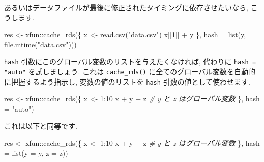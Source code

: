 \documentclass[
  11pt,
  lualatex,
  ja=standard]{bxjsreport}
\newenvironment{Shaded}{\begin{snugshade}}{\end{snugshade}}
\newcommand{\AttributeTok}[1]{\textcolor[rgb]{0.77,0.63,0.00}{#1}}
\newcommand{\CommentTok}[1]{\textcolor[rgb]{0.56,0.35,0.01}{\textit{#1}}}
\newcommand{\DecValTok}[1]{\textcolor[rgb]{0.00,0.00,0.81}{#1}}
\newcommand{\FunctionTok}[1]{\textcolor[rgb]{0.00,0.00,0.00}{#1}}
\newcommand{\NormalTok}[1]{#1}
\newcommand{\OtherTok}[1]{\textcolor[rgb]{0.56,0.35,0.01}{#1}}
\newcommand{\SpecialCharTok}[1]{\textcolor[rgb]{0.00,0.00,0.00}{#1}}
\newcommand{\StringTok}[1]{\textcolor[rgb]{0.31,0.60,0.02}{#1}}
\begin{document}
あるいはデータファイルが最後に修正されたタイミングに依存させたいなら, こうします.

\begin{Shaded}
\begin{Highlighting}[]
\NormalTok{res }\OtherTok{\textless{}{-}}\NormalTok{ xfun}\SpecialCharTok{::}\FunctionTok{cache\_rds}\NormalTok{(\{}
\NormalTok{  x }\OtherTok{\textless{}{-}} \FunctionTok{read.csv}\NormalTok{(}\StringTok{"data.csv"}\NormalTok{)}
\NormalTok{  x[[}\DecValTok{1}\NormalTok{]] }\SpecialCharTok{+}\NormalTok{ y}
\NormalTok{\}, }\AttributeTok{hash =} \FunctionTok{list}\NormalTok{(y, }\FunctionTok{file.mtime}\NormalTok{(}\StringTok{"data.csv"}\NormalTok{)))}
\end{Highlighting}
\end{Shaded}

\texttt{hash} 引数にこのグローバル変数のリストを与えたくなければ, 代わりに \texttt{hash = "auto"} を試しましょう. これは \texttt{cache\_rds()} に全てのグローバル変数を自動的に把握するよう指示し, 変数の値のリストを \texttt{hash} 引数の値として使わせます.

\begin{Shaded}
\begin{Highlighting}[]
\NormalTok{res }\OtherTok{\textless{}{-}}\NormalTok{ xfun}\SpecialCharTok{::}\FunctionTok{cache\_rds}\NormalTok{(\{}
\NormalTok{  x }\OtherTok{\textless{}{-}} \DecValTok{1}\SpecialCharTok{:}\DecValTok{10}
\NormalTok{  x }\SpecialCharTok{+}\NormalTok{ y }\SpecialCharTok{+}\NormalTok{ z  }\CommentTok{\# y と z はグローバル変数}
\NormalTok{\}, }\AttributeTok{hash =} \StringTok{"auto"}\NormalTok{)}
\end{Highlighting}
\end{Shaded}

これは以下と同等です.

\begin{Shaded}
\begin{Highlighting}[]
\NormalTok{res }\OtherTok{\textless{}{-}}\NormalTok{ xfun}\SpecialCharTok{::}\FunctionTok{cache\_rds}\NormalTok{(\{}
\NormalTok{  x }\OtherTok{\textless{}{-}} \DecValTok{1}\SpecialCharTok{:}\DecValTok{10}
\NormalTok{  x }\SpecialCharTok{+}\NormalTok{ y }\SpecialCharTok{+}\NormalTok{ z  }\CommentTok{\# y と z はグローバル変数}
\NormalTok{\}, }\AttributeTok{hash =} \FunctionTok{list}\NormalTok{(}\AttributeTok{y =}\NormalTok{ y, }\AttributeTok{z =}\NormalTok{ z))}
\end{Highlighting}
\end{Shaded}
\end{document}
